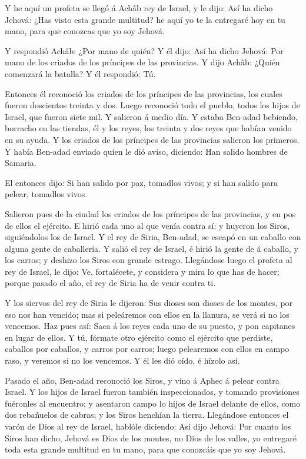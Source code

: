  Y he aquí un profeta se llegó á Achâb rey de Israel, y le
dijo: Así ha dicho Jehová: ¿Has visto esta grande multitud? he aquí yo
te la entregaré hoy en tu mano, para que conozcas que yo soy Jehová.

 Y respondió Achâb: ¿Por mano de quién? Y él dijo: Así ha
dicho Jehová: Por mano de los criados de los príncipes de las
provincias. Y dijo Achâb: ¿Quién comenzará la batalla? Y él respondió:
Tú.

 Entonces él reconoció los criados de los príncipes de las
provincias, los cuales fueron doscientos treinta y dos. Luego reconoció
todo el pueblo, todos los hijos de Israel, que fueron siete mil.
 Y salieron á medio día. Y estaba Ben-adad bebiendo,
borracho en las tiendas, él y los reyes, los treinta y dos reyes que
habían venido en su ayuda.  Y los criados de los príncipes
de las provincias salieron los primeros. Y había Ben-adad enviado quien
le dió aviso, diciendo: Han salido hombres de Samaria.

 El entonces dijo: Si han salido por paz, tomadlos vivos; y
si han salido para pelear, tomadlos vivos.

 Salieron pues de la ciudad los criados de los príncipes de
las provincias, y en pos de ellos el ejército.  E hirió
cada uno al que venía contra sí: y huyeron los Siros, siguiéndolos los
de Israel. Y el rey de Siria, Ben-adad, se escapó en un caballo con
alguna gente de caballería.  Y salió el rey de Israel, é
hirió la gente de á caballo, y los carros; y deshizo los Siros con
grande estrago.  Llegándose luego el profeta al rey de
Israel, le dijo: Ve, fortalécete, y considera y mira lo que has de
hacer; porque pasado el año, el rey de Siria ha de venir contra ti.

 Y los siervos del rey de Siria le dijeron: Sus dioses son
dioses de los montes, por eso nos han vencido; mas si peleáremos con
ellos en la llanura, se verá si no los vencemos.  Haz pues
así: Saca á los reyes cada uno de su puesto, y pon capitanes en lugar de
ellos.  Y tú, fórmate otro ejército como el ejército que
perdiste, caballos por caballos, y carros por carros; luego pelearemos
con ellos en campo raso, y veremos si no los vencemos. Y él les dió
oído, é hízolo así.

 Pasado el año, Ben-adad reconoció los Siros, y vino á
Aphec á pelear contra Israel.  Y los hijos de Israel fueron
también inspeccionados, y tomando provisiones fuéronles al encuentro; y
asentaron campo lo hijos de Israel delante de ellos, como dos rebañuelos
de cabras; y los Siros henchían la tierra.  Llegándose
entonces el varón de Dios al rey de Israel, hablóle diciendo: Así dijo
Jehová: Por cuanto los Siros han dicho, Jehová es Dios de los montes, no
Dios de los valles, yo entregaré toda esta grande multitud en tu mano,
para que conozcáis que yo soy Jehová.


